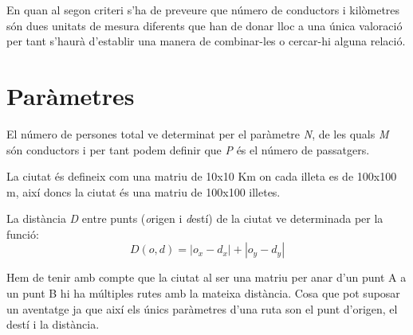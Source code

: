 En quan al segon criteri s'ha de preveure que número de conductors i kilòmetres són dues unitats de 
mesura diferents que han de donar lloc a una única valoració per tant s'haurà d'establir una manera 
de combinar-les o cercar-hi alguna relació.

\section{Paràmetres}

El número de persones total ve determinat per el paràmetre \emph{N}, de les quals \emph{M} són conductors i per
tant podem definir que \emph{P} és el número de passatgers. 

La ciutat és defineix com una matriu de 10x10 Km on cada illeta es de 100x100 m, així doncs
la ciutat és una matriu de 100x100 illetes.

La distància \emph{D} entre punts (\emph{o}rigen i \emph{d}estí) de la ciutat ve determinada per la funció:
$$ D(o,d) = |o_x - d_x| + |o_y - d_y| $$

Hem de tenir amb compte que la ciutat al ser una matriu per anar d'un punt A a un punt B hi ha múltiples
rutes amb la mateixa distància. Cosa que pot suposar un aventatge ja que així els únics paràmetres
d'una ruta son el punt d'origen, el destí i la distància.
